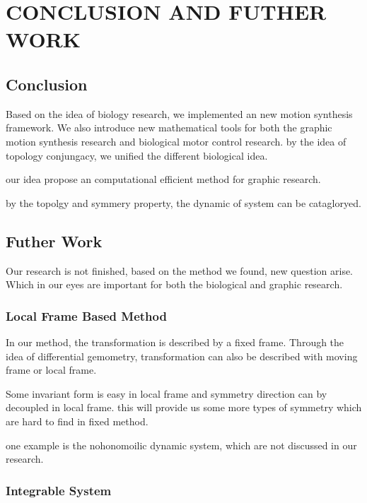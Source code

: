 \def\baselinestretch{1}
\chapter{CONCLUSION AND FUTHER WORK}
\label{chap:con}
\graphicspath{{Conclusions/ConclusionsFigs/EPS/}{Conclusions/ConclusionsFigs/}}


\def\baselinestretch{1.66}

\section{Conclusion}

Based on the idea of biology research, we implemented an new motion synthesis framework.
We also introduce new mathematical tools for both the graphic motion synthesis research and biological motor control research.
by the idea of topology conjungacy, we unified the different biological idea.

our idea propose an computational efficient method for graphic research.

by the topolgy and symmery property,
the dynamic of system can be catagloryed.




\section{Futher Work}
Our research is not finished, based on the method we found, new question arise.
Which in our eyes are important for both the biological and graphic research.
\subsection{Local Frame Based Method}
In our method, the transformation is described by a fixed frame.
Through the idea of differential gemometry, transformation can also be described with moving frame or local frame.

Some invariant form is easy in local frame and symmetry direction can by decoupled in local frame.
this will provide us  some more types of symmetry which are hard to find in fixed method.

one example is the nohonomoilic dynamic system, which are not discussed in our research.


\subsection{Integrable System}

